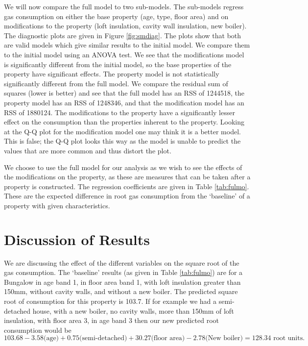 \documentclass[]{extarticle}
\begin{document}
We will now compare the full model to two sub-models. The sub-models regress gas consumption on either the base property (age, type, floor area) and on modifications to the property (loft insulation, cavity wall insulation, new boiler). The diagnostic plots are given in Figure \ref{fig:smdiag}. The plots show that both are valid models which give similar results to the initial model. We compare them to the initial model using an ANOVA test. We see that the modifications model is significantly different from the initial model, so the base properties of the property have significant effects. The property model is not statistically significantly different from the full model.  We compare the residual sum of squares (lower is better) and see that the full model has an RSS of 1244518, the property model has an RSS of 1248346, and that the modification model has an RSS of 1880124. The modifications to the property have a significantly lesser effect on the consumption than the properties inherent to the property. Looking at the Q-Q plot for the modification model one may think it is a better model. This is false; the Q-Q plot looks this way as the model is unable to predict the values that are more common and thus distort the plot. 

We choose to use the full model for our analysis as we wish to see the effects of the modifications on the property, as these are measures that can be taken after a property is constructed. The regression coefficients are given in Table \ref{tab:fulmo}. These are the expected difference in root gas consumption from the `baseline' of a property with given characteristics.

\section{Discussion of Results}

We are discussing the effect of the different variables on the square root of the gas consumption. The `baseline' results (as given in Table \ref{tab:fulmo}) are for a Bungalow in age band 1, in floor area band 1, with loft insulation greater than 150mm, without cavity walls, and without a new boiler. The predicted square root of consumption for this property is 103.7. If for example we had a semi-detached house, with a new boiler, no cavity walls, more than 150mm of loft insulation, with floor area 3, in age band 3 then our new predicted root consumption would be $$103.68 - 3.58 \text{(age)} + 0.75 \text{(semi-detached)} + 30.27 \text{(floor area)} - 2.78 \text{(New boiler)} = 128.34 \text{ root units}.$$
\end{document}
